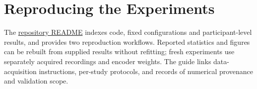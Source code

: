 \section{Reproducing the Experiments}
\label{app:reproduction}
The \href{https://github.com/sneddy/mgpa-paper\#reproduction-guide}{repository README}
indexes code, fixed configurations and participant-level results, and provides
two reproduction workflows. Reported statistics and figures can be rebuilt
from supplied results without refitting; fresh experiments use separately
acquired recordings and encoder weights. The guide links data-acquisition
instructions, per-study protocols, and records of numerical provenance and
validation scope.
